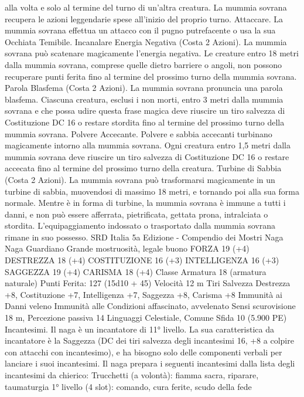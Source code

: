 \begin{multicols}{2}
alla volta e solo al termine del turno di un’altra creatura. La
mummia sovrana recupera le azioni leggendarie spese all’inizio
del proprio turno.
Attaccare. La mummia sovrana effettua un attacco con il pugno
putrefacente o usa la sua Occhiata Temibile.
Incanalare Energia Negativa (Costa 2 Azioni). La mummia
sovrana può scatenare magicamente l’energia negativa. Le
creature entro 18 metri dalla mummia sovrana, comprese quelle
dietro barriere o angoli, non possono recuperare punti ferita fino
al termine del prossimo turno della mummia sovrana.
Parola Blasfema (Costa 2 Azioni). La mummia sovrana
pronuncia una parola blasfema. Ciascuna creatura, esclusi i non
morti, entro 3 metri dalla mummia sovrana e che possa udire
questa frase magica deve riuscire un tiro salvezza di Costituzione
DC 16 o restare stordita fino al termine del prossimo turno della
mummia sovrana.
Polvere Accecante. Polvere e sabbia accecanti turbinano
magicamente intorno alla mummia sovrana. Ogni creatura entro
1,5 metri dalla mummia sovrana deve riuscire un tiro salvezza di
Costituzione DC 16 o restare accecata fino al termine del
prossimo turno della creatura.
Turbine di Sabbia (Costa 2 Azioni). La mummia sovrana può
trasformarsi magicamente in un turbine di sabbia, muovendosi di
massimo 18 metri, e tornando poi alla sua forma normale.
Mentre è in forma di turbine, la mummia sovrana è immune a
tutti i danni, e non può essere afferrata, pietrificata, gettata prona,
intralciata o stordita. L’equipaggiamento indossato o trasportato
dalla mummia sovrana rimane in suo possesso.
SRD Italia 5a Edizione - Compendio dei Mostri
Naga
Naga Guardiano
Grande mostruosità, legale buono
FORZA 19 (+4)
DESTREZZA 18 (+4)
COSTITUZIONE 16 (+3)
INTELLIGENZA 16 (+3)
SAGGEZZA 19 (+4)
CARISMA 18 (+4)
Classe Armatura 18 (armatura naturale)
\hspace*{0pt}\hfill{Punti Ferita}: 127 (15d10 + 45)
Velocità 12 m
Tiri Salvezza Destrezza +8, Costituzione +7, Intelligenza +7,
Saggezza +8, Carisma +8
Immunità ai Danni veleno
Immunità alle Condizioni affascinato, avvelenato
Sensi scurovisione 18 m, Percezione passiva 14
Linguaggi Celestiale, Comune
Sfida 10 (5.900 PE)
Incantesimi. Il naga è un incantatore di 11° livello. La sua
caratteristica da incantatore è la Saggezza (DC dei tiri salvezza
degli incantesimi 16, +8 a colpire con attacchi con incantesimo),
e ha bisogno solo delle componenti verbali per lanciare i suoi
incantesimi. Il naga prepara i seguenti incantesimi dalla lista
degli incantesimi da chierico:
Trucchetti (a volontà): fiamma sacra, riparare, taumaturgia
1° livello (4 slot): comando, cura ferite, scudo della fede

\end{multicols}
